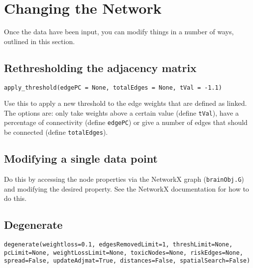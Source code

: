 \documentclass{report}
\begin{document}

\section{Changing the Network}
Once the data have been input, you can modify things in a number of ways, outlined in this section.

\subsection{Rethresholding the adjacency matrix}

\noindent \texttt{apply_threshold(edgePC = None, totalEdges = None, tVal = -1.1)}

\vspace{12pt}

Use this to apply a new threshold to the edge weights that are defined as linked. The options are: only take weights above a certain value (define \texttt{tVal}), have a percentage of connectivity (define \texttt{edgePC}) or give a number of edges that should be connected (define \texttt{totalEdges}). 

\subsection{Modifying a single data point}

Do this by accessing the node properties via the NetworkX graph (\texttt{brainObj.G}) and modifying the desired property. See the NetworkX documentation for how to do this.

\subsection{Degenerate}

\noindent \texttt{degenerate(weightloss=0.1, edgesRemovedLimit=1, threshLimit=None,
                   pcLimit=None, weightLossLimit=None, toxicNodes=None,
                   riskEdges=None, spread=False, updateAdjmat=True,
                   distances=False, spatialSearch=False)}

\vspace{12pt}
\end{document}
